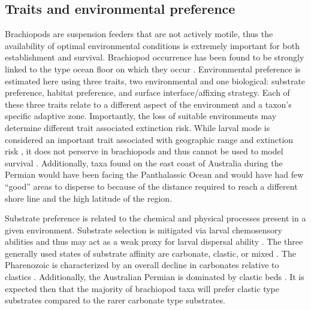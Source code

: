 \documentclass[12pt,letterpaper]{article}
\begin{document}
\subsection{Traits and environmental preference} \label{sec:bracback}
Brachiopods are suspension feeders that are not actively motile, thus the availability of optimal environmental conditions is extremely important for both establishment and survival. Brachiopod occurrence has been found to be strongly linked to the type ocean floor on which they occur \citep{Richardson1997,Richardson1997a}. Environmental preference is estimated here using three traits, two environmental and one biological: substrate preference, habitat preference, and surface interface/affixing strategy. Each of these three traits relate to a different aspect of the environment and a taxon's specific adaptive zone. Importantly, the loss of suitable environments may determine different trait associated extinction risk. While larval mode is considered an important trait associated with geographic range and extinction risk \citep{Jablonski2006a,Jablonski1983}, it does not perserve in brachiopods and thus cannot be used to model survival \citep{Jablonski1983}. Additionally, taxa found on the east coast of Australia during the Permian would have been facing the Panthalassic Ocean and would have had few ``good'' areas to disperse to because of the distance required to reach a different shore line and the high latitude of the region.

Substrate preference is related to the chemical and physical processes present in a given environment. Substrate selection is mitigated via larval chemosensory abilities and thus may act as a weak proxy for larval dispersal ability \citep{Jablonski2006a,Jablonski1983}. The three generally used states of substrate affinity are carbonate, clastic, or mixed \citep{Foote2006,Anderson2011a,Nurnberg2013a,Kiessling2007a,Miller2001}. The Pharenozoic is characterized by an overall decline in carbonates relative to clastics \citep{Foote2006,Miller2001}. Additionally, the Australian Permian is dominated by clastic beds \citep{Birgenheier2010,Percival2012,Thomas2007,Fielding2008a,Fielding2008}. It is expected then that the majority of brachiopod taxa will prefer clastic type substrates compared to the rarer carbonate type substrates.
\end{document}
